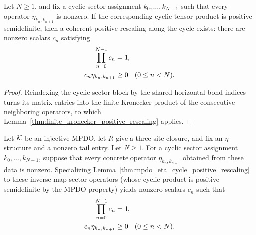 \begin{lemma}%
    \label{thm:mpdo_eta_cycle_positive_rescaling}
    \leanok
    Let $N\geq1$, and fix a cyclic sector assignment
    $k_0,\ldots,k_{N-1}$ such that every operator
    $\eta_{k_n,k_{n+1}}$ is nonzero. If the corresponding cyclic tensor
    product is positive semidefinite, then a coherent positive rescaling along
    the cycle exists: there are nonzero scalars $c_n$ satisfying
    \begin{align}
        \prod_{n=0}^{N-1}c_n  & =1,
        \notag                                           \\
        c_n\eta_{k_n,k_{n+1}} & \geq0 \quad (0\leq n<N).
        \notag
    \end{align}
\end{lemma}

\begin{proof}
    \leanok
    Reindexing the cyclic sector block by the shared horizontal-bond indices
    turns its matrix entries into the finite Kronecker product of the
    consecutive neighboring operators, to which
    Lemma~\ref{thm:finite_kronecker_positive_rescaling} applies.
\end{proof}

\begin{corollary}%
    \label{cor:mpdo_sector_eta_cycle_positive_rescaling}
    \leanok
    Let ${\cal K}$ be an injective MPDO, let $R$ give a three-site closure,
    and fix an $\eta$-structure and a nonzero tail entry. Let $N\geq1$. For a
    cyclic sector assignment $k_0,\ldots,k_{N-1}$, suppose that every
    concrete operator $\eta_{k_n,k_{n+1}}$ obtained from these data is
    nonzero. Specializing
    Lemma~\ref{thm:mpdo_eta_cycle_positive_rescaling} to these inverse-map
    sector operators (whose cyclic product is positive semidefinite by the MPDO
    property) yields nonzero scalars $c_n$ such that
    \begin{align}
        \prod_{n=0}^{N-1}c_n  & =1,
        \notag                                           \\
        c_n\eta_{k_n,k_{n+1}} & \geq0 \quad (0\leq n<N).
        \notag
    \end{align}
\end{corollary}

